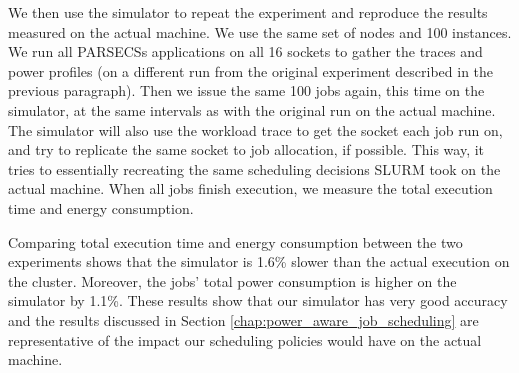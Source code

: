 We then use the simulator to repeat the experiment and reproduce the results measured on
the actual machine.  We use the same set of nodes and 100 instances.  
We run all PARSECSs
applications on all 16 sockets to gather the traces and power profiles (on a different run 
from the original experiment described in the previous paragraph).  Then we issue the same
100 jobs again, this time on the simulator, at the same intervals as with the original run
on the actual machine.  The simulator will also use the workload trace to get the socket each
job run on, and try to replicate the same socket to job allocation, if possible.
This way, it tries to essentially recreating the same scheduling decisions SLURM took on the actual machine.
When all jobs finish execution, we measure the total execution time and energy
consumption.

Comparing total execution time and energy consumption between the two experiments shows
that the simulator is 1.6\% slower than the actual execution on the cluster.  Moreover,
the jobs' total power consumption is higher on the simulator by 1.1\%.  These results
show that our simulator has very good accuracy and the results discussed in Section 
\ref{chap:power_aware_job_scheduling} are representative of the impact our scheduling
policies would have on the actual machine.

